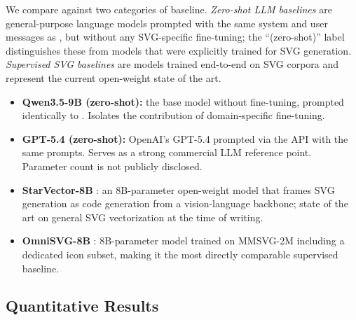 We compare against two categories of baseline.
\textit{Zero-shot LLM baselines} are general-purpose language models prompted
with the same system and user messages as \method{}, but without any
SVG-specific fine-tuning; the ``(zero-shot)'' label distinguishes these from
models that were explicitly trained for SVG generation.
\textit{Supervised SVG baselines} are models trained end-to-end on SVG
corpora and represent the current open-weight state of the art.

\begin{itemize}
    \item \textbf{Qwen3.5-9B (zero-shot):} the base model without fine-tuning,
          prompted identically to \method{}. Isolates the contribution of
          domain-specific fine-tuning.

    \item \textbf{GPT-5.4 (zero-shot):}
          OpenAI's GPT-5.4 prompted via the API with the same prompts.
          Serves as a strong commercial LLM reference point.
          Parameter count is not publicly disclosed.

    \item \textbf{StarVector-8B} \citep{rodriguez2025starvector}: an
          8B-parameter open-weight model that frames SVG generation as
          code generation from a vision-language backbone; state of the art
          on general SVG vectorization at the time of writing.

    \item \textbf{OmniSVG-8B} \citep{yang2025omnisvg}: 8B-parameter model
          trained on MMSVG-2M including a dedicated icon subset, making it
          the most directly comparable supervised baseline.
\end{itemize}

\subsection{Quantitative Results}


